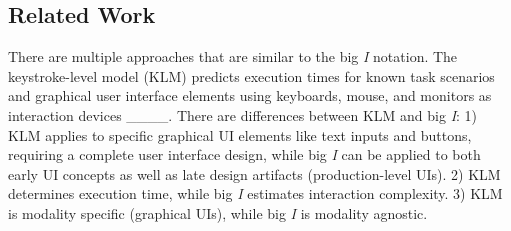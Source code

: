 \subsection{Related Work}

There are multiple approaches that are similar to the big \textit{I} notation. The keystroke-level model (KLM) predicts execution times for known task scenarios and graphical user interface elements using keyboards, mouse, and monitors as interaction devices ____. 
There are differences between KLM and big \textit{I}: 1) KLM applies to specific graphical UI elements like text inputs and buttons, requiring a complete user interface design, while big \textit{I} can be applied to both early UI concepts as well as late design artifacts (production-level UIs). 2) KLM determines execution time, while big \textit{I} estimates interaction complexity. 3) KLM is modality specific (graphical UIs), while big \textit{I} is modality agnostic.


